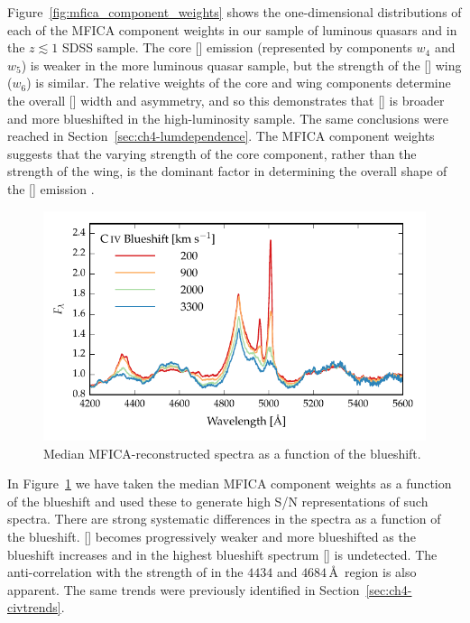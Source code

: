 Figure~\ref{fig:mfica_component_weights} shows the one-dimensional distributions of each of the MFICA component weights in our sample of luminous quasars and in the $z \lesssim 1$ SDSS sample. 
The core [] emission (represented by components $w_4$ and $w_5$) is weaker in the more luminous quasar sample, but the strength of the [] wing ($w_6$) is similar.
The relative weights of the core and wing components determine the overall [] width and asymmetry, and so this demonstrates that [] is broader and more blueshifted in the high-luminosity sample.
The same conclusions were reached in Section~\ref{sec:ch4-lumdependence}. 
The MFICA component weights suggests that the varying strength of the core component, rather than the strength of the wing, is the dominant factor in determining the overall shape of the [] emission \citep[e.g.][]{shen14}. 

\begin{figure}
    \centering
    \includegraphics[width=\columnwidth]{figures/chapter04/mfica_composites.pdf} 
    \caption[{Median MFICA-reconstructed spectra as a function of the  blueshift.}]{Median MFICA-reconstructed spectra as a function of the  blueshift.}     
    \label{fig:mfica_composites}
\end{figure}

In Figure~\ref{fig:mfica_composites} we have taken the median MFICA component weights as a function of the  blueshift and used these to generate high S/N representations of such spectra. 
There are strong systematic differences in the spectra as a function of the  blueshift. 
[] becomes progressively weaker and more blueshifted as the  blueshift increases and in the highest  blueshift spectrum [] is undetected. 
The anti-correlation with the strength of  in the $4434$ and $4684$\,\AA\, region is also apparent. 
The same trends were previously identified in Section~\ref{sec:ch4-civtrends}.

